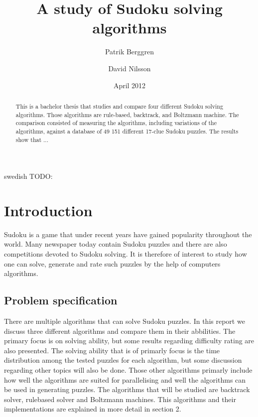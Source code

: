 \documentclass[a4paper,11pt]{kth-mag}
\title{A study of Sudoku solving algorithms}
\subtitle{}
\author{Patrik Berggren \and David Nilsson}
\date{April 2012}
\begin{document}
\frontmatter
\pagestyle{empty}
\removepagenumbers
\maketitle
{}
\begin{abstract}
This is a bachelor thesis that studies and compare four different Sudoku
solving algorithms.
Those algorithms are rule-based, backtrack, and Boltzmann machine.
 The comparison consisted of measuring the algorithms, including
variations of the algorithms, against a database of 49 151 different 17-clue Sudoku
puzzles.
The results show that ...
\end{abstract}
\clearpage
\begin{foreignabstract}{swedish}
TODO: 
\end{foreignabstract}
\clearpage
\tableofcontents*
\mainmatter
\pagestyle{newchap}

\chapter{Introduction}
Sudoku is a game that under recent years have gained popularity throughout the world.
Many newspaper today contain Sudoku puzzles and there are also competitions devoted 
to Sudoku solving.
It is therefore of interest to study how one can solve, generate and rate such puzzles by the help of computers algorithms.

\section{Problem specification}
There are multiple algorithms that can solve Sudoku puzzles.
In this report we discuss three different algorithms and compare them in their abbilities.
The primary focus is on solving ability, but some results regarding difficulty rating are also presented.
The solving ability that is of primarly focus is the time distribution among the tested puzzles for each algorithm, but some discussion regarding other topics will also be done.
Those other algorithms primarly include how well the algorithms are suited for parallelising and well the algorithms can be used in generating puzzles.
The algorithms that will be studied are backtrack solver, rulebased solver and Boltzmann machines. 
This algorithms and their implementations are explained in more detail in section 2. 
\end{document}
